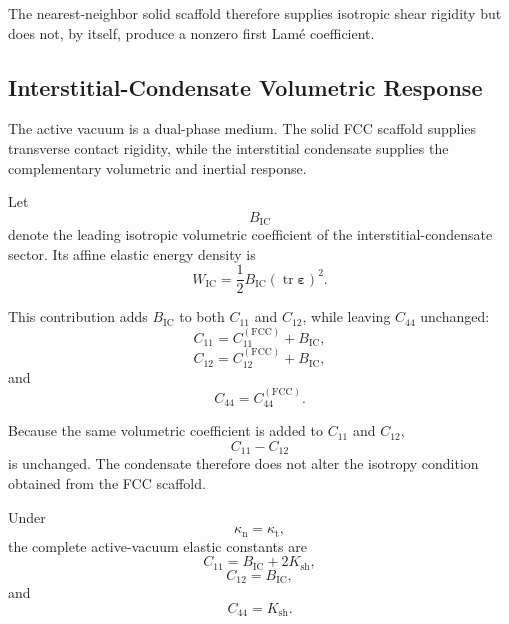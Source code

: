 The nearest-neighbor solid scaffold therefore supplies isotropic shear rigidity but does not, by itself, produce a nonzero first Lam\'{e} coefficient.

\subsection{Interstitial-Condensate Volumetric Response}

The active vacuum is a dual-phase medium. The solid FCC scaffold supplies transverse contact rigidity, while the interstitial condensate supplies the complementary volumetric and inertial response.

Let
\begin{equation}
    B_{\mathrm{IC}}
\end{equation}
denote the leading isotropic volumetric coefficient of the interstitial-condensate sector. Its affine elastic energy density is
\begin{equation}
    \boxed{ W_{\mathrm{IC}} = \frac{1}{2} B_{\mathrm{IC}} \left( \operatorname{tr} \boldsymbol{\varepsilon} \right)^2. }
\end{equation}

This contribution adds $B_{\mathrm{IC}}$ to both $C_{11}$ and $C_{12}$, while leaving $C_{44}$ unchanged:
\begin{equation}
    C_{11} = C_{11}^{(\mathrm{FCC})} + B_{\mathrm{IC}},
\end{equation}
\begin{equation}
    C_{12} = C_{12}^{(\mathrm{FCC})} + B_{\mathrm{IC}},
\end{equation}
and
\begin{equation}
    C_{44} = C_{44}^{(\mathrm{FCC})}.
\end{equation}

Because the same volumetric coefficient is added to $C_{11}$ and $C_{12}$,
\begin{equation}
    C_{11}-C_{12}
\end{equation}
is unchanged. The condensate therefore does not alter the isotropy condition obtained from the FCC scaffold.

Under
\begin{equation}
    \kappa_{\mathrm{n}} = \kappa_{\mathrm{t}},
\end{equation}
the complete active-vacuum elastic constants are
\begin{equation}
    \boxed{ C_{11} = B_{\mathrm{IC}} + 2K_{\mathrm{sh}}, }
\end{equation}
\begin{equation}
    \boxed{ C_{12} = B_{\mathrm{IC}}, }
\end{equation}
and
\begin{equation}
    \boxed{ C_{44} = K_{\mathrm{sh}}. }
\end{equation}

